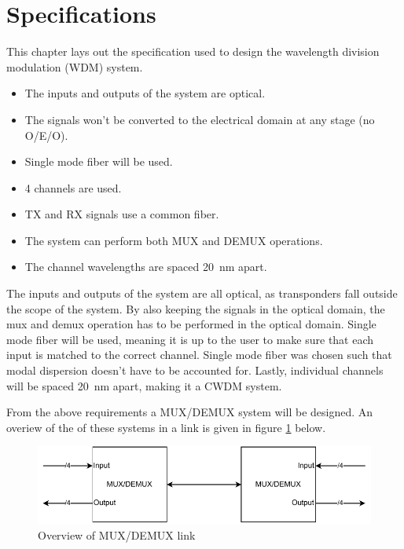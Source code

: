 \section{Specifications}
\label{sec:specifications}
This chapter lays out the specification used to design the wavelength division modulation (WDM) system.

\begin{itemize}
 \item The inputs and outputs of the system are optical.
 \item The signals won't be converted to the electrical domain at any stage (no O/E/O). 
 \item Single mode fiber will be used.
 \item 4 channels are used.
 \item TX and RX signals use a common fiber.
 \item The system can perform both MUX and DEMUX operations.
 \item The channel wavelengths are spaced \qty{20}{\nm} apart.
\end{itemize}

The inputs and outputs of the system are all optical, as transponders fall outside the 
scope of the system. By also keeping the signals in the optical domain, the mux and demux 
operation has to be performed in the optical domain. Single mode fiber will be used, 
meaning it is up to the user to make sure that each input is matched to the correct channel. 
Single mode fiber was chosen such that modal dispersion doesn't have to be accounted for. 
Lastly, individual channels will be spaced  \qty{20}{\nm} apart, making it a CWDM system.

From the above requirements a MUX/DEMUX system will be designed. An overiew of the of these 
systems in a link is given in figure \ref{fig:link_overview} below.

\begin{figure}[h]
    \includegraphics[width=\linewidth]{images/link_overview.pdf}
    \caption{Overview of MUX/DEMUX link}
    \label{fig:link_overview}
\end{figure}